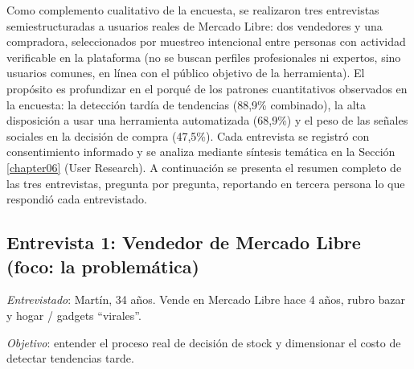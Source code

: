 
Como complemento cualitativo de la encuesta, se realizaron tres entrevistas semiestructuradas a usuarios reales de Mercado Libre: dos vendedores y una compradora, seleccionados por muestreo intencional entre personas con actividad verificable en la plataforma (no se buscan perfiles profesionales ni expertos, sino usuarios comunes, en línea con el público objetivo de la herramienta). El propósito es profundizar en el porqué de los patrones cuantitativos observados en la encuesta: la detección tardía de tendencias (88,9\% combinado), la alta disposición a usar una herramienta automatizada (68,9\%) y el peso de las señales sociales en la decisión de compra (47,5\%). Cada entrevista se registró con consentimiento informado y se analiza mediante síntesis temática en la Sección \ref{chapter06} (User Research). A continuación se presenta el resumen completo de las tres entrevistas, pregunta por pregunta, reportando en tercera persona lo que respondió cada entrevistado.

\subsection*{Entrevista 1: Vendedor de Mercado Libre (foco: la problemática)}

\emph{Entrevistado}: Martín, 34 años. Vende en Mercado Libre hace 4 años, rubro bazar y hogar / gadgets ``virales''.

\emph{Objetivo}: entender el proceso real de decisión de stock y dimensionar el costo de detectar tendencias tarde.

